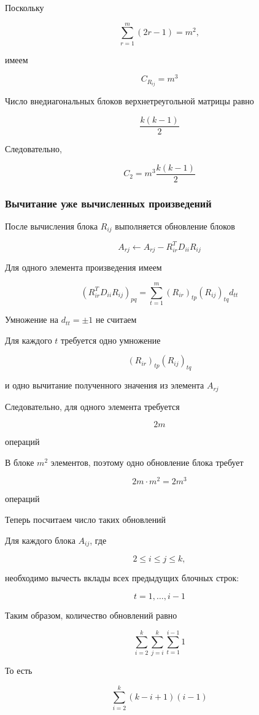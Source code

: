 \documentclass[a4paper,12pt]{article}
\begin{document}
Поскольку

$$
\sum_{r=1}^{m}(2r-1)=m^2,
$$

имеем

$$
C_{R_{ij}}=m^3
$$

Число внедиагональных блоков верхнетреугольной матрицы равно

$$
\frac{k(k-1)}{2}
$$

Следовательно,

$$
C_2
=
m^3\frac{k(k-1)}{2}
$$

\subsubsection{Вычитание уже вычисленных произведений}

После вычисления блока \(R_{ij}\) выполняется обновление блоков

$$
A_{rj}
\leftarrow
A_{rj}
-
R_{ir}^{T}D_{ii}R_{ij}
$$

Для одного элемента произведения имеем

$$
(R_{ir}^{T}D_{ii}R_{ij})_{pq}
=
\sum_{t=1}^{m}
(R_{ir})_{tp}(R_{ij})_{tq}d_{tt}
$$

Умножение на \(d_{tt}=\pm1\) не считаем

Для каждого \(t\) требуется одно умножение

$$
(R_{ir})_{tp}(R_{ij})_{tq}
$$

и одно вычитание полученного значения из элемента \(A_{rj}\)

Следовательно, для одного элемента требуется

$$
2m
$$

операций

В блоке \(m^2\) элементов, поэтому одно обновление блока требует

$$
2m\cdot m^2=2m^3
$$

операций

Теперь посчитаем число таких обновлений

Для каждого блока \(A_{ij}\), где

$$
2\le i\le j\le k,
$$

необходимо вычесть вклады всех предыдущих блочных строк:

$$
t=1,\ldots,i-1
$$

Таким образом, количество обновлений равно

$$
\sum_{i=2}^{k}
\sum_{j=i}^{k}
\sum_{t=1}^{i-1}1
$$

То есть

$$
\sum_{i=2}^{k}(k-i+1)(i-1)
$$
\end{document}
